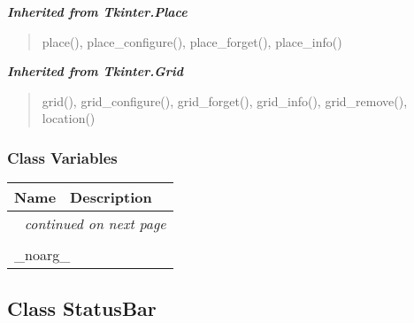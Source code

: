 \large{\textbf{\textit{Inherited from Tkinter.Place}}}

\begin{quote}
place(), place\_configure(), place\_forget(), place\_info()
\end{quote}

\large{\textbf{\textit{Inherited from Tkinter.Grid}}}

\begin{quote}
grid(), grid\_configure(), grid\_forget(), grid\_info(), grid\_remove(), location()
\end{quote}


  \subsubsection{Class Variables}

    \vspace{-1cm}
\hspace{\varindent}\begin{longtable}{|p{\varnamewidth}|p{\vardescrwidth}|l}
\cline{1-2}
\cline{1-2} \centering \textbf{Name} & \centering \textbf{Description}& \\
\cline{1-2}
\endhead\cline{1-2}\multicolumn{3}{r}{\small\textit{continued on next page}}\\\endfoot\cline{1-2}
\endlastfoot\multicolumn{2}{|l|}{\textit{Inherited from Tkinter.Misc}}\\
\multicolumn{2}{|p{\varwidth}|}{\raggedright \_noarg\_}\\
\cline{1-2}
\end{longtable}



\subsection{Class StatusBar}

